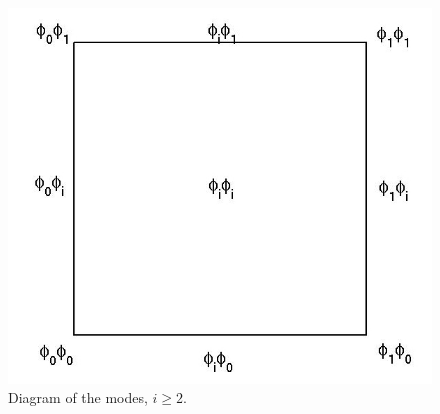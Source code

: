 \begin{figure}
\centering
\includegraphics[scale=0.25]{images/modes_diagram.jpg}
\caption{Diagram of the modes, $i\geq 2$.}\label{fig:modes_diagram}
\end{figure}

